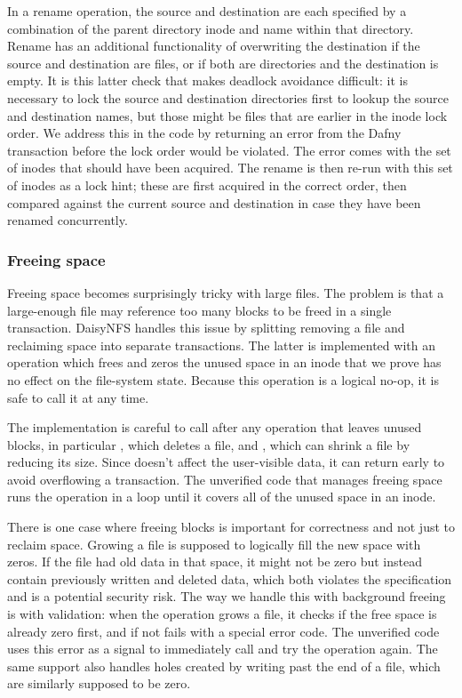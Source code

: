 In a rename operation, the source and destination are each specified by a
combination of the parent directory inode and name within that directory. Rename
has an additional functionality of overwriting the destination if the source and
destination are files, or if both are directories and the destination is empty.
It is this latter check that makes deadlock avoidance difficult: it is necessary
to lock the source and destination directories first to lookup the source and
destination names, but those might be files that are earlier in the inode lock
order. We address this in the code by returning an error from the Dafny
transaction before the lock order would be violated. The error comes with the
set of inodes that should have been acquired.  The rename is then re-run with
this set of inodes as a lock hint; these are first acquired in the correct
order, then compared against the current source and destination in case they
have been renamed concurrently.

\subsubsection{Freeing space}
\label{sec:dafny:freeing}

Freeing space becomes surprisingly tricky with large files. The problem is that
a large-enough file may reference too many blocks to be
freed in a single transaction.
DaisyNFS handles this issue by splitting removing a file and reclaiming space
into separate transactions. The latter is implemented with an operation
 which frees and zeros the unused space in an inode that
we prove has no effect on the file-system state. Because this operation is a
logical no-op, it is safe to call it at any time.

The implementation is careful to call  after any operation
that leaves unused blocks, in particular , which deletes a file, and
, which can shrink a file by reducing its size. Since
 doesn't affect the user-visible data, it can return early to
avoid overflowing a transaction. The unverified code that manages freeing space
runs the operation in a loop until it covers all of the unused space in an
inode.

There is one case where freeing blocks is important for correctness and not just
to reclaim space. Growing a file is supposed to logically fill the new space
with zeros. If the file had old data in that space, it might not be zero but
instead contain previously written and deleted data, which both violates the specification and
is a potential security risk. The way we handle this with background freeing is
with validation: when the  operation grows a file, it checks if the
free space is already zero first, and if not fails with a special error code. The
unverified code uses this error as a signal to immediately call
 and try the operation again. The same support also handles
holes created by writing past the end of a file, which are similarly supposed to
be zero.

